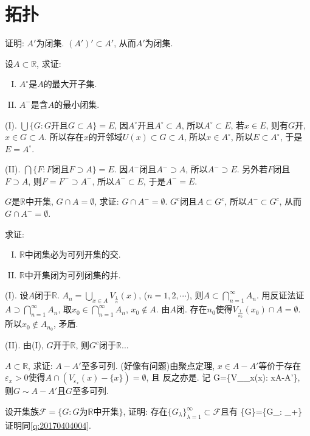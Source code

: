 \chapter{拓扑}
\bq{}{}
证明: $A'$为闭集.
\eq
\ba
$(A')'\subset A'$, 从而$A'$为闭集.
\ea

\bq{}{}
设$A\subset\mathbb{R}$, 求证:
\begin{enumerate}[(I)]
 \item $A^{\circ}$是$A$的最大开子集.
 \item $A^{-}$是含$A$的最小闭集.
\end{enumerate}
\eq
\ba
(I). $\bigcup\{G:G\textrm{开且}G\subset A\}=E$, 因$A^{\circ}$开且$A^{\circ}\subset A$, 所以$A^{\circ}\subset E$,
若$x\in E$, 则有$G$开, $x\in G\subset A$. 所以存在$x$的开邻域$U(x)\subset G\subset A$, 所以$x\in A^{\circ}$, 
所以$E\subset A^{\circ}$, 于是$E=A^{\circ}$.

(II). $\bigcap\{F: F\textrm{闭且}F\supset A\}=E$. 因$A^{-}$闭且$A^{-}\supset A$, 所以$A^{-}\supset E$. 另外若$F$闭且$F\supset A$, 
则$F=F^{-}\supset A^{-}$, 所以$A^{-}\subset E$, 于是$A^{-}=E$.
\ea

\bq{}{}
$G$是$\mathbb{R}$中开集, $G\cap A=\emptyset$, 求证: $G\cap A^{-}=\emptyset$.
\eq
\ba
$G^c$闭且$A\subset G^c$, 所以$A^{-}\subset G^c$, 从而$G\cap A^{-}=\emptyset$.
\ea

\bq{}{}
求证:
\begin{enumerate}[(I)]
 \item $\mathbb{R}$中闭集必为可列开集的交.
 \item $\mathbb{R}$中开集闭为可列闭集的并.
\end{enumerate}
\eq
\ba
(I). 设$A$闭于$\mathbb{R}$. $A_{n}=\bigcup_{x\in A}V_{\frac{1}{n}}(x)$, ($n=1,2,\cdots$), 则$A\subset\bigcap_{n=1}^{\infty}A_n$.
用反证法证$A\supset\bigcap_{n=1}^{\infty}A_n$, 取$x_0\in\bigcap_{n=1}^{\infty}A_n$, $x_0\notin A$. 由$A$闭. 存在$n_0$使得$V_{\frac{1}{n_0}}(x_0)\cap A=\emptyset$.
所以$x_0\notin A_{n_0}$, 矛盾.

(II). 由(I), $G$开于$\mathbb{R}$, 则$G^c$闭于$\mathbb{R}$...
\ea

\bq{}{}
$A\subset \mathbb{R}$, 求证: $A-A'$至多可列.
\eq
\ba
(好像有问题)由聚点定理, $x\in A-A'$等价于存在$\varepsilon_x>0$使得$A\cap(V_{\varepsilon_x}(x)-\{x\})=\emptyset$, 且{} 反之亦是. 记
\bee
G=\{V_{\varepsilon_x}(x): x\in A-A'\},
\eee
则$G\sim A-A'$且$G$至多可列.
\ea

\bq{}{}
设开集族$\mathscr{F}=\{G: G\textrm{为}\mathbb{R}\textrm{中开集}\}$, 证明: 存在$\{G_{\lambda}\}_{\lambda=1}^{\infty}\subset\mathscr{F}$且有
\bee
\cup\{G\in{}\}=\cup\{G_{\lambda}: \lambda\in{}_{+}\}
\eee
\eq
\ba
证明同\ref{q:20170404004}.
\ea

